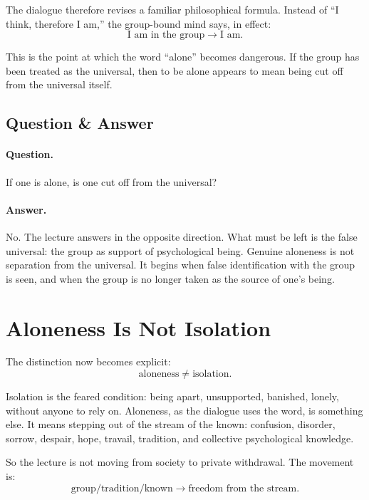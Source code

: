The dialogue therefore revises a familiar philosophical formula. Instead of ``I think, therefore I am,'' the group-bound mind says, in effect:
\begin{equation}
\text{I am in the group}
\longrightarrow
\text{I am}.
\end{equation}

This is the point at which the word ``alone'' becomes dangerous. If the group has been treated as the universal, then to be alone appears to mean being cut off from the universal itself.

\subsection{Question \& Answer}

\paragraph{Question.}
If one is alone, is one cut off from the universal?

\paragraph{Answer.}
No. The lecture answers in the opposite direction. What must be left is the false universal: the group as support of psychological being. Genuine aloneness is not separation from the universal. It begins when false identification with the group is seen, and when the group is no longer taken as the source of one's being.

\section{Aloneness Is Not Isolation}

The distinction now becomes explicit:
\begin{equation}
\text{aloneness} \neq \text{isolation}.
\end{equation}

Isolation is the feared condition: being apart, unsupported, banished, lonely, without anyone to rely on. Aloneness, as the dialogue uses the word, is something else. It means stepping out of the stream of the known: confusion, disorder, sorrow, despair, hope, travail, tradition, and collective psychological knowledge.

So the lecture is not moving from society to private withdrawal. The movement is:
\begin{equation}
\text{group/tradition/known}
\longrightarrow
\text{freedom from the stream}.
\end{equation}

